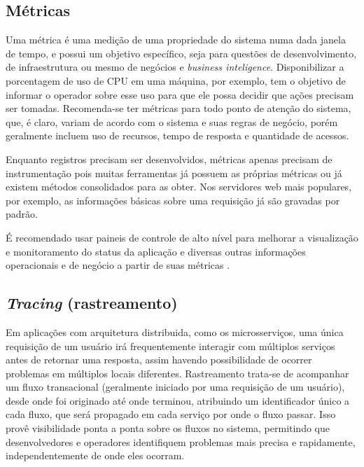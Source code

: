 
\subsection{Métricas}
Uma métrica é uma medição de uma propriedade do sistema numa dada janela de tempo, e possui um objetivo específico, seja para questões de desenvolvimento, de infraestrutura ou mesmo de negócios e \emph{business inteligence}. Disponibilizar a porcentagem de uso de CPU em uma máquina, por exemplo, tem o objetivo de informar o operador sobre esse uso para que ele possa decidir que ações precisam ser tomadas. Recomenda-se ter métricas para todo ponto de atenção do sistema, que, é claro, variam de acordo com o sistema e suas regras de negócio, porém geralmente incluem uso de recursos, tempo de resposta e quantidade de acessos.

Enquanto registros precisam ser desenvolvidos, métricas apenas precisam de instrumentação pois muitas ferramentas já possuem as próprias métricas ou já existem métodos consolidados para as obter. Nos servidores web mais populares, por exemplo, as informações básicas sobre uma requisição já são gravadas por padrão.

É recomendado usar paineis de controle de alto nível para melhorar a visualização e monitoramento do status da aplicação e diversas outras informações operacionais e de negócio a partir de suas métricas \cite{martin-fowler-microservices}.

\subsection{\emph{Tracing} (rastreamento)}
Em aplicações com arquitetura distribuida, como os microsserviços, uma única requisição de um usuário irá frequentemente interagir com múltiplos serviços antes de retornar uma resposta, assim havendo possibilidade de ocorrer problemas em múltiplos locais diferentes. Rastreamento trata-se de acompanhar um fluxo transacional (geralmente iniciado por uma requisição de um usuário), desde onde foi originado até onde terminou, atribuindo um identificador único a cada fluxo, que será propagado em cada serviço por onde o fluxo passar. Isso provê visibilidade ponta a ponta sobre os fluxos no sistema, permitindo que desenvolvedores e operadores identifiquem problemas mais precisa e rapidamente, independentemente de onde eles ocorram. 

